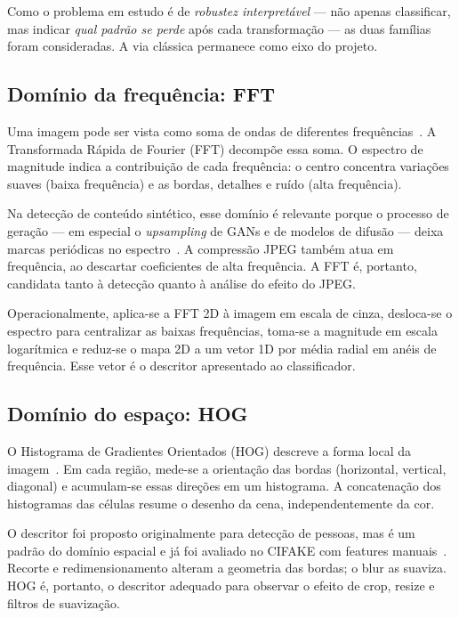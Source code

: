 \documentclass[12pt]{article}
\begin{document}
Como o problema em estudo é de \emph{robustez interpretável} --- não apenas classificar, mas indicar \emph{qual padrão se perde} após cada transformação --- as duas famílias foram consideradas. A via clássica permanece como eixo do projeto.

\subsection{Domínio da frequência: FFT}

Uma imagem pode ser vista como soma de ondas de diferentes frequências~\cite{gonzalez2018}. A Transformada Rápida de Fourier (FFT) decompõe essa soma. O espectro de magnitude indica a contribuição de cada frequência: o centro concentra variações suaves (baixa frequência) e as bordas, detalhes e ruído (alta frequência).

Na detecção de conteúdo sintético, esse domínio é relevante porque o processo de geração --- em especial o \emph{upsampling} de GANs e de modelos de difusão --- deixa marcas periódicas no espectro~\cite{frank2020frequency,bammey2024synthbuster}. A compressão JPEG também atua em frequência, ao descartar coeficientes de alta frequência. A FFT é, portanto, candidata tanto à detecção quanto à análise do efeito do JPEG.

Operacionalmente, aplica-se a FFT 2D à imagem em escala de cinza, desloca-se o espectro para centralizar as baixas frequências, toma-se a magnitude em escala logarítmica e reduz-se o mapa 2D a um vetor 1D por média radial em anéis de frequência. Esse vetor é o descritor apresentado ao classificador.

\subsection{Domínio do espaço: HOG}

O Histograma de Gradientes Orientados (HOG) descreve a forma local da imagem~\cite{dalal2005hog}. Em cada região, mede-se a orientação das bordas (horizontal, vertical, diagonal) e acumulam-se essas direções em um histograma. A concatenação dos histogramas das células resume o desenho da cena, independentemente da cor.

O descritor foi proposto originalmente para detecção de pessoas, mas é um padrão do domínio espacial e já foi avaliado no CIFAKE com features manuais~\cite{nirob2026handcrafted}. Recorte e redimensionamento alteram a geometria das bordas; o blur as suaviza. HOG é, portanto, o descritor adequado para observar o efeito de crop, resize e filtros de suavização.
\end{document}

